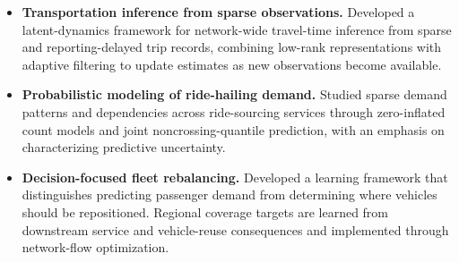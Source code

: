 \begin{itemize}

\item \textbf{Transportation inference from sparse observations.}
Developed a latent-dynamics framework for network-wide
travel-time inference from sparse and reporting-delayed
trip records, combining low-rank representations with
adaptive filtering to update estimates as new
observations become available.

\item \textbf{Probabilistic modeling of ride-hailing demand.}
Studied sparse demand patterns and dependencies across
ride-sourcing services through zero-inflated count models
and joint noncrossing-quantile prediction, with an
emphasis on characterizing predictive uncertainty.

\item \textbf{Decision-focused fleet rebalancing.}
Developed a learning framework that distinguishes
predicting passenger demand from determining where
vehicles should be repositioned. Regional coverage
targets are learned from downstream service and
vehicle-reuse consequences and implemented through
network-flow optimization.

\end{itemize}
